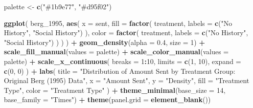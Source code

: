 \documentclass[
]{article}
\newenvironment{Shaded}{\begin{snugshade}}{\end{snugshade}}
\newcommand{\AttributeTok}[1]{\textcolor[rgb]{0.13,0.29,0.53}{#1}}
\newcommand{\DecValTok}[1]{\textcolor[rgb]{0.00,0.00,0.81}{#1}}
\newcommand{\FloatTok}[1]{\textcolor[rgb]{0.00,0.00,0.81}{#1}}
\newcommand{\FunctionTok}[1]{\textcolor[rgb]{0.13,0.29,0.53}{\textbf{#1}}}
\newcommand{\NormalTok}[1]{#1}
\newcommand{\OtherTok}[1]{\textcolor[rgb]{0.56,0.35,0.01}{#1}}
\newcommand{\SpecialCharTok}[1]{\textcolor[rgb]{0.81,0.36,0.00}{\textbf{#1}}}
\newcommand{\StringTok}[1]{\textcolor[rgb]{0.31,0.60,0.02}{#1}}
\begin{document}
\begin{Shaded}
\begin{Highlighting}[]
\NormalTok{palette }\OtherTok{\textless{}{-}} \FunctionTok{c}\NormalTok{(}\StringTok{"\#1b9e77"}\NormalTok{, }\StringTok{"\#d95f02"}\NormalTok{)}

\FunctionTok{ggplot}\NormalTok{(}
\NormalTok{  berg\_1995,}
  \FunctionTok{aes}\NormalTok{(}
    \AttributeTok{x =}\NormalTok{ sent,}
    \AttributeTok{fill =} \FunctionTok{factor}\NormalTok{(}
\NormalTok{      treatment,}
      \AttributeTok{labels =} \FunctionTok{c}\NormalTok{(}\StringTok{"No History"}\NormalTok{, }\StringTok{"Social History"}\NormalTok{)}
\NormalTok{    ),}
    \AttributeTok{color =} \FunctionTok{factor}\NormalTok{(}
\NormalTok{      treatment,}
      \AttributeTok{labels =} \FunctionTok{c}\NormalTok{(}\StringTok{"No History"}\NormalTok{, }\StringTok{"Social History"}\NormalTok{)}
\NormalTok{    )}
\NormalTok{  )}
\NormalTok{) }\SpecialCharTok{+}
  \FunctionTok{geom\_density}\NormalTok{(}\AttributeTok{alpha =} \FloatTok{0.4}\NormalTok{, }\AttributeTok{size =} \DecValTok{1}\NormalTok{) }\SpecialCharTok{+}
  \FunctionTok{scale\_fill\_manual}\NormalTok{(}\AttributeTok{values =}\NormalTok{ palette) }\SpecialCharTok{+}
  \FunctionTok{scale\_color\_manual}\NormalTok{(}\AttributeTok{values =}\NormalTok{ palette) }\SpecialCharTok{+}
  \FunctionTok{scale\_x\_continuous}\NormalTok{(}
    \AttributeTok{breaks =} \DecValTok{1}\SpecialCharTok{:}\DecValTok{10}\NormalTok{,}
    \AttributeTok{limits =} \FunctionTok{c}\NormalTok{(}\DecValTok{1}\NormalTok{, }\DecValTok{10}\NormalTok{),}
    \AttributeTok{expand =} \FunctionTok{c}\NormalTok{(}\DecValTok{0}\NormalTok{, }\DecValTok{0}\NormalTok{)}
\NormalTok{  ) }\SpecialCharTok{+}
  \FunctionTok{labs}\NormalTok{(}
    \AttributeTok{title =} \StringTok{"Distribution of Amount Sent by Treatment Group: Original Berg (1995) Data"}\NormalTok{,}
    \AttributeTok{x =} \StringTok{"Amount Sent"}\NormalTok{,}
    \AttributeTok{y =} \StringTok{"Density"}\NormalTok{,}
    \AttributeTok{fill =} \StringTok{"Treatment Type"}\NormalTok{,}
    \AttributeTok{color =} \StringTok{"Treatment Type"}
\NormalTok{  ) }\SpecialCharTok{+}
  \FunctionTok{theme\_minimal}\NormalTok{(}\AttributeTok{base\_size =} \DecValTok{14}\NormalTok{, }\AttributeTok{base\_family =} \StringTok{"Times"}\NormalTok{) }\SpecialCharTok{+}
  \FunctionTok{theme}\NormalTok{(}\AttributeTok{panel.grid =} \FunctionTok{element\_blank}\NormalTok{())}
\end{Highlighting}
\end{Shaded}
\end{document}
